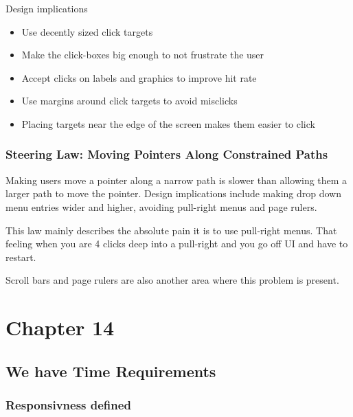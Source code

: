 \documentclass[11pt,]{article}
\providecommand{\tightlist}{%
  \setlength{\itemsep}{0pt}\setlength{\parskip}{0pt}}
\begin{document}
Design implications

\begin{itemize}
\tightlist
\item
  Use decently sized click targets
\item
  Make the click-boxes big enough to not frustrate the user
\item
  Accept clicks on labels and graphics to improve hit rate
\item
  Use margins around click targets to avoid misclicks
\item
  Placing targets near the edge of the screen makes them easier to click
\end{itemize}

\hypertarget{steering-law-moving-pointers-along-constrained-paths}{%
\subsubsection{Steering Law: Moving Pointers Along Constrained
Paths}\label{steering-law-moving-pointers-along-constrained-paths}}

Making users move a pointer along a narrow path is slower than allowing
them a larger path to move the pointer. Design implications include
making drop down menu entries wider and higher, avoiding pull-right
menus and page rulers.

This law mainly describes the absolute pain it is to use pull-right
menus. That feeling when you are 4 clicks deep into a pull-right and you
go off UI and have to restart.

Scroll bars and page rulers are also another area where this problem is
present.

\hypertarget{chapter-14}{%
\section{Chapter 14}\label{chapter-14}}

\hypertarget{we-have-time-requirements}{%
\subsection{We have Time Requirements}\label{we-have-time-requirements}}

\hypertarget{responsivness-defined}{%
\subsubsection{Responsivness defined}\label{responsivness-defined}}
\end{document}

